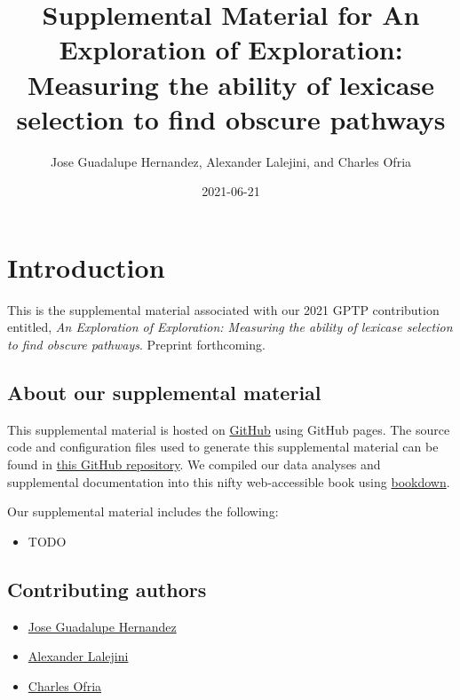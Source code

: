 \documentclass[]{book}
\title{Supplemental Material for An Exploration of Exploration: Measuring the ability of lexicase selection to find obscure pathways}
\author{Jose Guadalupe Hernandez, Alexander Lalejini, and Charles Ofria}
\date{2021-06-21}
\providecommand{\tightlist}{%
  \setlength{\itemsep}{0pt}\setlength{\parskip}{0pt}}
\begin{document}
\maketitle

{
\setcounter{tocdepth}{1}
\tableofcontents
}
\hypertarget{introduction}{%
\chapter{Introduction}\label{introduction}}

This is the supplemental material associated with our 2021 GPTP contribution entitled, \emph{An Exploration of Exploration: Measuring the ability of lexicase selection to find obscure pathways}.
Preprint forthcoming.

\hypertarget{about-our-supplemental-material}{%
\section{About our supplemental material}\label{about-our-supplemental-material}}

This supplemental material is hosted on \href{https://github.com}{GitHub} using GitHub pages.
The source code and configuration files used to generate this supplemental material can be found in \href{https://github.com/jgh9094/GPTP-2021-Exploration-Of-Exploration}{this GitHub repository}.
We compiled our data analyses and supplemental documentation into this nifty web-accessible book using \href{https://bookdown.org/}{bookdown}.

Our supplemental material includes the following:

\begin{itemize}
\tightlist
\item
  TODO
\end{itemize}

\hypertarget{contributing-authors}{%
\section{Contributing authors}\label{contributing-authors}}

\begin{itemize}
\tightlist
\item
  \href{https://jgh9094.github.io/}{Jose Guadalupe Hernandez}
\item
  \href{https://lalejini.com}{Alexander Lalejini}
\item
  \href{http://ofria.com}{Charles Ofria}
\end{itemize}
\end{document}
